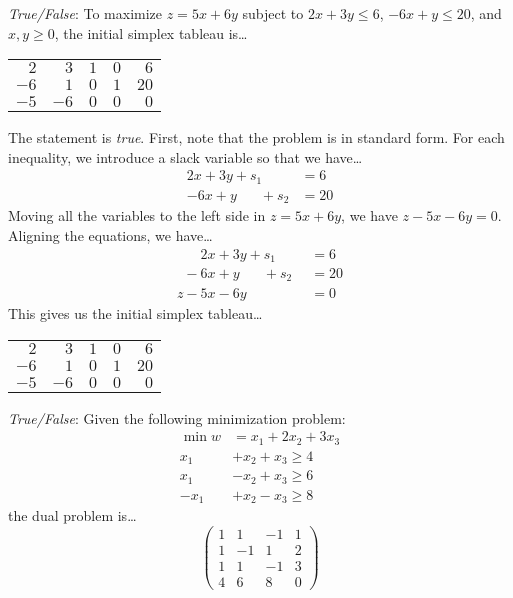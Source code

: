 \documentclass[11pt,letterpaper]{article}
\begin{document}
\quizsol \textit{True/False}:
To maximize $z= 5x + 6y$ subject to $2x + 3y \leq 6$, $-6x + y \leq 20$, and $x, y \geq 0$, the initial simplex tableau is\dots
	\begin{center}
	\begin{tabular}{rrrr|r}
	$2$ & $3$ & $1$ & $0$ & $6$ \\
	$-6$ & $1$ & $0$ & $1$ & $20$ \\ \hline
	$-5$ & $-6$ & $0$ & $0$ & $0$
	\end{tabular}
	\end{center} \pspace

\sol The statement is \textit{true}. First, note that the problem is in standard form. For each inequality, we introduce a slack variable so that we have\dots
	\[
	\begin{aligned}
	2x + 3y + s_1 \phantom{+ s_2}&= 6 \\
	-6x + y \phantom{+ s_1} + s_2&= 20
	\end{aligned}
	\]
Moving all the variables to the left side in $z= 5x + 6y$, we have $z - 5x - 6y= 0$. Aligning the equations, we have\dots
	\[
	\begin{aligned}
	\phantom{z -} 2x + 3y + s_1 \phantom{+ s_2}&= 6 \\
	\phantom{z } -6x + y \phantom{+ s_1} + s_2&= 20 \\
	z - 5x -6y \phantom{+ s_1 + s_2}&= 0
	\end{aligned}
	\]
This gives us the initial simplex tableau\dots
	\begin{center}
	\begin{tabular}{rrrr|r}
	$2$ & $3$ & $1$ & $0$ & $6$ \\
	$-6$ & $1$ & $0$ & $1$ & $20$ \\ \hline
	$-5$ & $-6$ & $0$ & $0$ & $0$
	\end{tabular}
	\end{center}



\newpage



\quizsol \textit{True/False}:
Given the following minimization problem:
	\[
	\begin{aligned}
	\min w&= x_1 + 2x_2 + 3x_3 \\
	x_1 &+ x_2 + x_3 \geq 4 \\
	x_1 &- x_2 + x_3 \geq 6 \\
	-x_1 &+ x_2 - x_3 \geq 8
	\end{aligned}
	\]
the dual problem is\dots
	\[
	\begin{pmatrix}
	1 & 1 & -1 & 1 \\
	1 & -1 & 1 & 2 \\
	1 & 1 & -1 & 3 \\
	4 & 6 & 8 & 0 
	\end{pmatrix}
	\] \pspace
\end{document}
